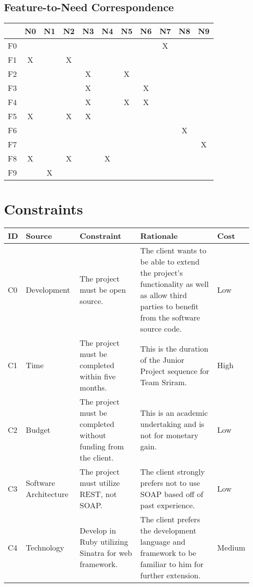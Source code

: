 \documentclass{article}
\begin{document}
\subsection{Feature-to-Need Correspondence}
\begin{tabular}{ | c || c | c | c | c | c | c | c | c | c | c | }
\hline
   & N0 & N1 & N2 & N3 & N4 & N5 & N6 & N7 & N8 & N9 \\
\hline
\hline
F0 &    &    &    &    &    &    &    & X  &    &    \\
\hline
F1 & X  &    & X  &    &    &    &    &    &    &    \\
\hline
F2 &    &    &    & X  &    & X  &    &    &    &    \\
\hline
F3 &    &    &    & X  &    &    & X  &    &    &    \\
\hline
F4 &    &    &    & X  &    & X  & X  &    &    &    \\
\hline
F5 & X  &    & X  & X  &    &    &    &    &    &    \\
\hline
F6 &    &    &    &    &    &    &    &    & X  &    \\
\hline
F7 &    &    &    &    &    &    &    &    &    & X  \\
\hline
F8 & X  &    & X  &    & X  &    &    &    &    &    \\
\hline
F9 &    & X  &    &    &    &    &    &    &    &    \\
\hline
\end{tabular}

\section{Constraints}
\begin{tabular}{ | p{0.15in} | p{0.75in} | p{1.8in} | p{2.3in} | p{0.5in} | }
\hline
\textbf{ID} & \textbf{Source} & \textbf{Constraint} & \textbf{Rationale} & \textbf{Cost}\\
\hline
\hline
C0 & Development & The project must be open source. & The client wants to be able to extend the project's functionality as well as allow third parties to benefit from the software source code. & Low \\
\hline
C1 & Time & The project must be completed within five months. & This is the duration of the Junior Project sequence for Team Sriram. & High \\
\hline
C2 & Budget & The project must be completed without funding from the client. & This is an academic undertaking and is not for monetary gain. & Low \\
\hline
C3 & Software Architecture & The project must utilize REST, not SOAP. & The client strongly prefers not to use SOAP based off of past experience. & Low \\
\hline
C4 & Technology & Develop in Ruby utilizing Sinatra for web framework. & The client prefers the development language and framework to be familiar to him for further extension. & Medium \\
\hline
\end{tabular}
\end{document}
